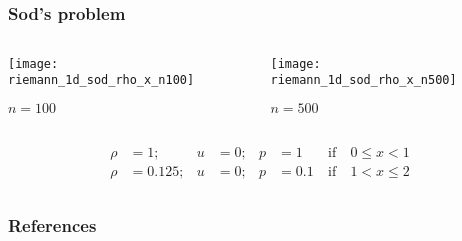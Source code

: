 \subsection{}
\begin{frame}[fragile]
    \frametitle{Sod's problem \parencite{sod1978survey}}

    \begin{columns}
        \begin{column}{.40\textwidth}
            \centering
            \texttt{[image: riemann\_1d\_sod\_rho\_x\_n100]}

            {$n=100$}
        \end{column}

        \begin{column}{.40\textwidth}
            \centering
            \texttt{[image: riemann\_1d\_sod\_rho\_x\_n500]}

            {$n=500$}
        \end{column}
    \end{columns}

    \bigskip\vfill

    \[
        \begin{gathered}
            \begin{aligned}
                \rho &= 1; & u &= 0; & p &= 1 & \ \text{if}\ & 0 \le x < 1 \\
                \rho &= 0.125; & u &= 0; & p &= 0.1 & \ \text{if}\ & 1 < x \le 2
            \end{aligned}
        \end{gathered}
    \]
\end{frame}
\subsection{}
\begin{frame}[allowframebreaks]
    \frametitle{References}
    \printbibliography[heading=none]%
\end{frame}
